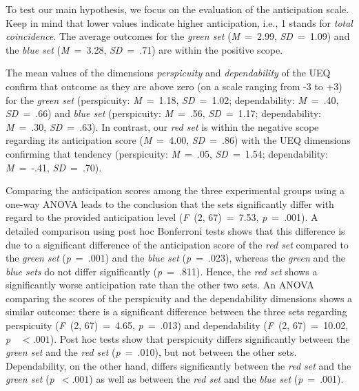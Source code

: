 \documentclass{sigchi}
\begin{document}
To test our main hypothesis, we focus on the evaluation of the anticipation scale. Keep in mind that lower values indicate higher anticipation, i.e., 1 stands for \textit{total coincidence}. The average outcomes for the \textit{green set} (\textit{M}~=~2.99, \textit{SD}~=~1.09) and the \textit{blue set} (\textit{M}~=~3.28, \textit{SD}~=~.71) are within the positive scope. 


The mean values of the dimensions \textit{perspicuity} and \textit{dependability} of the UEQ confirm that outcome as they are above zero (on a scale ranging from -3 to +3) for the \textit{green set} (perspicuity: \textit{M}~=~1.18, \textit{SD}~=~1.02; dependability: \textit{M}~=~.40, \textit{SD}~=~.66) and \textit{blue set} (perspicuity: \textit{M}~=~.56, \textit{SD}~=~1.17; dependability: \textit{M}~=~.30, \textit{SD}~=~.63). 
In contrast, our \textit{red set} is within the negative scope regarding its anticipation score (\textit{M}~=~4.00, \textit{SD}~=~.86) with the UEQ dimensions confirming that tendency (perspicuity: \textit{M}~=~.05, \textit{SD}~=~1.54; dependability: \textit{M}~=~-.41, \textit{SD}~=~.70).


Comparing the anticipation scores among the three experimental groups using a one-way ANOVA leads to the conclusion that the sets significantly differ with regard to the provided anticipation level (\textit{F}~(2, 67)~=~7.53, \textit{p}~=~.001). A detailed comparison using post hoc Bonferroni tests shows that this difference is due to a significant difference of the anticipation score of the \textit{red set} compared to the \textit{green set} (\textit{p}~=~.001) and the \textit{blue set} (\textit{p}~=~.023), whereas the \textit{green} and the \textit{blue sets} do not differ significantly (\textit{p}~=~.811). Hence, the \textit{red set} shows a significantly worse anticipation rate than the other two sets. An ANOVA comparing the scores of the perspicuity and the dependability dimensions shows a similar outcome: there is a significant difference between the three sets regarding perspicuity (\textit{F}~(2, 67)~=~4.65, \textit{p}~=~.013) and dependability (\textit{F}~(2, 67)~=~10.02, \textit{p}~~$ < .001$). Post hoc tests show that perspicuity differs significantly between the \textit{green set} and the \textit{red set} (\textit{p}~=~.010), but not between the other sets. Dependability, on the other hand, differs significantly between the \textit{red set} and the \textit{green set} (\textit{p}~$ < .001$) as well as between the \textit{red set} and the \textit{blue set} (\textit{p}~=~.001). 
\end{document}

